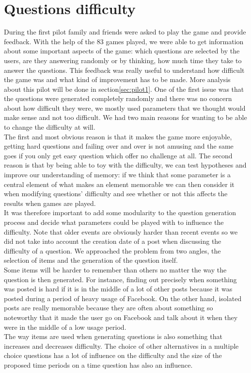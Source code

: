 \chapter{Questions difficulty}
During the first pilot family and friends were asked to play the game and provide feedback. With the help of the 83 games played, we were able to get information about some important aspects of the game: which questions are selected by the users, are they answering randomly or by thinking, how much time they take to answer the questions. This feedback was really useful to understand how difficult the game was and what kind of improvement has to be made. More analysis about this pilot will be done in section\ref{sec:pilot1}. One of the first issue was that the questions were generated completely randomly and there was no concern about how difficult they were, we mostly used parameters that we thought would make sense and not too difficult. We had two main reasons for wanting to be able to change the difficulty at will.\\
The first and most obvious reason is that it makes the game more enjoyable, getting hard questions and failing over and over is  not amusing and the same goes if you only get easy question which offer no challenge at all. The second reason is that by being able to toy with the difficulty, we can test hypotheses and improve our understanding of memory: if we think that some parameter is a central element of what makes an element memorable we can then consider it when modifying questions' difficulty and see whether or not this affects the results when games are played.\\
It was therefore important to add some modularity to the question generation process and decide what parameters could be played with to influence the difficulty. Note that older events are obviously harder than recent events so we did not take into account the creation date of a post when discussing the difficulty of a question. We approached the problem from two angles, the selection of items and the generation of the question itself.\\
Some items will be harder to remember than others no matter the way the question is then generated. For instance, finding out precisely when something was posted is hard if it is in the middle of a lot of other posts because it was posted during a period of heavy usage of Facebook. On the other hand, isolated posts are really memorable because they are often about something so noteworthy that it made the user go on Facebook and talk about it when they were in the middle of a low usage period.\\
The way items are used when generating questions is also something that increases and decreases difficulty. The choice of other alternatives in a multiple choice questions has a lot of influence on the difficulty and the size of the proposed time periods on a time question has also an influence.

